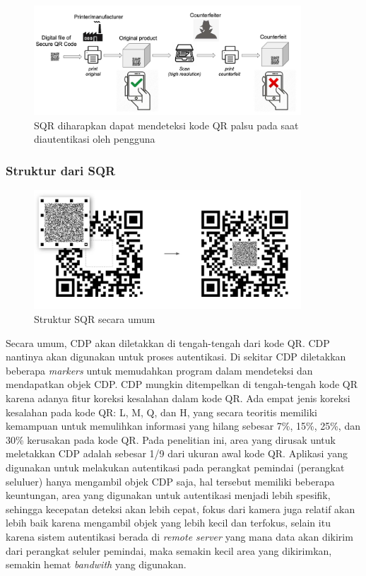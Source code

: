 \begin{figure}[h]
	\centering
	\includegraphics[width=10cm]{contents/chapter-2/2-counterveiterpractice.jpg}
	\caption{SQR diharapkan dapat mendeteksi kode QR palsu pada saat diautentikasi oleh pengguna \cite{picard2021counterfeit}}
	\label{Fig: 2-counterveiterpractice}
\end{figure}

\subsubsection{Struktur dari SQR}
\begin{figure}[h]
	\centering
	\includegraphics[width=10cm]{contents/chapter-2/2-struktursqr.jpg}
	\caption{Struktur SQR secara umum \cite{picard2021counterfeit}}
	\label{Fig: 2-struktursqr}
\end{figure}

Secara umum, CDP akan diletakkan di tengah-tengah dari kode QR. CDP nantinya akan digunakan untuk proses autentikasi. Di sekitar CDP diletakkan beberapa
\emph{markers} untuk memudahkan program dalam mendeteksi dan mendapatkan objek CDP. CDP mungkin ditempelkan di tengah-tengah kode QR karena adanya fitur
koreksi kesalahan dalam kode QR. Ada empat jenis koreksi kesalahan pada kode QR: L, M, Q, dan H, yang secara teoritis memiliki kemampuan untuk memulihkan
informasi yang hilang sebesar 7\%, 15\%, 25\%, dan 30\% kerusakan pada kode QR. Pada penelitian ini, area yang dirusak untuk meletakkan CDP adalah sebesar 1/9
dari ukuran awal kode QR. Aplikasi yang digunakan untuk melakukan autentikasi pada perangkat pemindai (perangkat seluluer) hanya mengambil objek CDP saja, hal
tersebut memiliki beberapa keuntungan, area yang digunakan untuk autentikasi menjadi lebih spesifik, sehingga kecepatan deteksi akan lebih cepat, fokus dari
kamera juga relatif akan lebih baik karena mengambil objek yang lebih kecil dan terfokus, selain itu karena sistem autentikasi berada di \emph{remote server}
yang mana data akan dikirim dari perangkat seluler pemindai, maka semakin kecil area yang dikirimkan, semakin hemat \emph{bandwith} yang digunakan.

